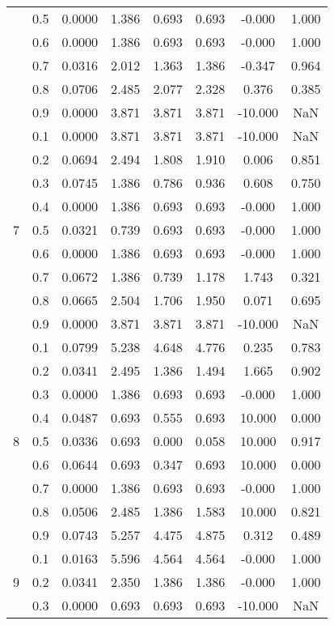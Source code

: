 \documentclass[11pt,a4paper]{report}
\begin{document}
\begin{longtable}{ | c | c || c | c | c | c | c | c | }
 & 0.5 & 0.0000 & 1.386 & 0.693 & 0.693 & -0.000 & 1.000 \\
 & 0.6 & 0.0000 & 1.386 & 0.693 & 0.693 & -0.000 & 1.000 \\
 & 0.7 & 0.0316 & 2.012 & 1.363 & 1.386 & -0.347 & 0.964 \\
 & 0.8 & 0.0706 & 2.485 & 2.077 & 2.328 & 0.376 & 0.385 \\
 & 0.9 & 0.0000 & 3.871 & 3.871 & 3.871 & -10.000 & NaN \\
 \hline
\multirow{9}{*}{7} & 0.1 & 0.0000 & 3.871 & 3.871 & 3.871 & -10.000 & NaN \\
 & 0.2 & 0.0694 & 2.494 & 1.808 & 1.910 & 0.006 & 0.851 \\
 & 0.3 & 0.0745 & 1.386 & 0.786 & 0.936 & 0.608 & 0.750 \\
 & 0.4 & 0.0000 & 1.386 & 0.693 & 0.693 & -0.000 & 1.000 \\
 & 0.5 & 0.0321 & 0.739 & 0.693 & 0.693 & -0.000 & 1.000 \\
 & 0.6 & 0.0000 & 1.386 & 0.693 & 0.693 & -0.000 & 1.000 \\
 & 0.7 & 0.0672 & 1.386 & 0.739 & 1.178 & 1.743 & 0.321 \\
 & 0.8 & 0.0665 & 2.504 & 1.706 & 1.950 & 0.071 & 0.695 \\
 & 0.9 & 0.0000 & 3.871 & 3.871 & 3.871 & -10.000 & NaN \\
 \hline
\multirow{9}{*}{8} & 0.1 & 0.0799 & 5.238 & 4.648 & 4.776 & 0.235 & 0.783 \\
 & 0.2 & 0.0341 & 2.495 & 1.386 & 1.494 & 1.665 & 0.902 \\
 & 0.3 & 0.0000 & 1.386 & 0.693 & 0.693 & -0.000 & 1.000 \\
 & 0.4 & 0.0487 & 0.693 & 0.555 & 0.693 & 10.000 & 0.000 \\
 & 0.5 & 0.0336 & 0.693 & 0.000 & 0.058 & 10.000 & 0.917 \\
 & 0.6 & 0.0644 & 0.693 & 0.347 & 0.693 & 10.000 & 0.000 \\
 & 0.7 & 0.0000 & 1.386 & 0.693 & 0.693 & -0.000 & 1.000 \\
 & 0.8 & 0.0506 & 2.485 & 1.386 & 1.583 & 10.000 & 0.821 \\
 & 0.9 & 0.0743 & 5.257 & 4.475 & 4.875 & 0.312 & 0.489 \\
 \hline
\multirow{9}{*}{9} & 0.1 & 0.0163 & 5.596 & 4.564 & 4.564 & -0.000 & 1.000 \\
 & 0.2 & 0.0341 & 2.350 & 1.386 & 1.386 & -0.000 & 1.000 \\
 & 0.3 & 0.0000 & 0.693 & 0.693 & 0.693 & -10.000 & NaN \\

\end{longtable}
\end{document}
